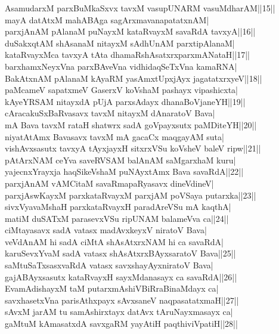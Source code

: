 \documentclass{article}
\begin{document}
AsamudarxM parxBuMkaSxvx tavxM vasupUNARM vasuMdharAM||15||\\
mayA datAtxM mahABAga sagArxmavanapatatxnAM|\\
parxjAnAM pAlanaM puNayxM kataRvayxM savaRdA tavxyA||16||\\
duSakxqtAM shAsanaM nitayxM sAdhUnAM parxtipAlanaM|\\
kataRvayxMca tavxyA tAta dhamaRshAsatxrxparxmANataH||17||\\
barxhamxNeyxVna parxBAveVna vidhidaqSeTxVna kamaRNA|\\
BakAtxnAM pAlanaM kAyaRM yasAmxtUpxjAyx jagatatxrxyeV||18||\\
paMcameV sapatxmeV GaserxV koVshaM pashayx vipashicxta|\\
kAyeYRSAM nitayxdA pUjA parxsAdayx dhanaBoVjaneYH||19||\\
cAracakuSxBaRvasavx tavxM nitayxM dAnaratoV Bava|\\
mA Bava tavxM rataH shatwrx sadA goVpayxsutx paMDiteYH||20||\\
niyatAtAmx Bavasavx tavxM mA gacaCx maqgayAM suta|\\
vishAvxsasutx tavxyA tAyxjayxH sitxrxVSu koVsheV baleV ripw||21||\\
pAtArxNAM ceYva saveRVSAM balAnAM saMgarxhaM kuru|\\
yajecnxYrayxja haqSikeVshaM puNAyxtAmx Bava savaRdA||22||\\
parxjAnAM vAMCitaM savaRmapaRyasavx dineVdineV|\\
parxjAswKayxM parxkataRvayxM parxjAM poVSaya putarxka||23||\\
sivxVyavaMshaH parxkataRvayxH paradAreVSu mA kaqthA|\\
matiM duSATxM parasevxVSu ripUNAM balameVva ca||24||\\
ciMtayasavx sadA vatasx madAvxkeyxV niratoV Bava|\\
veVdAnAM hi sadA ciMtA shAsAtxrxNAM hi ca savaRdA|\\
karuSevxYvaM sadA vatasx shAsAtxrxBAyxsaratoV Bava||25||\\
saMtuSaTxsasxvaRdA vatasx savxshayAyxniratoV Bava|\\
gajABAyxsasutx kataRvayxH sayxMdanasayx ca savaRdA||26||\\
EvamAdishayxM taM putarxmAshiVBiRraBinaMdayx ca|\\
savxhasetxVna parisAthxpayx sAvxsaneV naqpasatatxmaH||27||\\
sAvxM jarAM tu samAshirxtayx datAvx tAruNayxmasayx ca|\\
gaMtuM kAmasatxdA savxgaRM yayAtiH paqthiviVpatiH||28||
\end{document}
